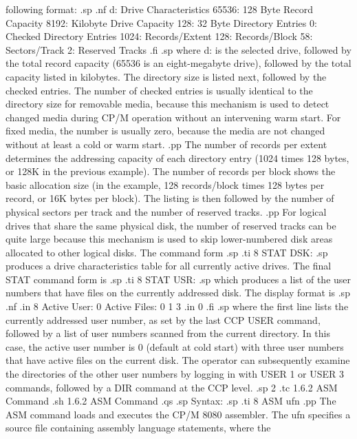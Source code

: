 following format:
.sp
.nf
            d: Drive Characteristics
        65536: 128 Byte Record Capacity
         8192: Kilobyte Drive Capacity
          128: 32 Byte Directory Entries
            0: Checked Directory Entries
         1024: Records/Extent
          128: Records/Block
           58: Sectors/Track
            2: Reserved Tracks
.fi
.sp
where d: is the selected drive, followed by the total record capacity 
(65536 is an eight-megabyte drive), followed by the total capacity listed in 
kilobytes.  The directory size is listed next, followed by the checked 
entries.  The number of checked entries is usually identical to the directory 
size for removable media, because this mechanism is used to detect changed 
media during CP/M operation without an intervening warm start.  For fixed 
media, the number is usually zero, because the media are not changed without 
at least a cold or warm start.  
.pp
The number of records per extent determines 
the addressing capacity of each directory entry (1024 times 128 bytes, or 
128K in the previous example).  The number of records per block shows the 
basic allocation size (in the example, 128 records/block times 128 bytes per 
record, or 16K bytes per block).  The listing is then followed by the number 
of physical sectors per track and the number of reserved tracks.  
.pp
For logical 
drives that share the same physical disk, the number of reserved tracks can 
be quite large because this mechanism is used to skip lower-numbered disk 
areas allocated to other logical disks.  The command form
.sp
.ti 8
STAT DSK:
.sp
produces a drive characteristics table for all currently active drives.  The 
final STAT command form is
.sp
.ti 8
STAT USR:
.sp
which produces a list of the user numbers that have files on the currently 
addressed disk.  The display format is
.sp
.nf
.in 8
Active User:   0
Active Files:  0 1 3
.in 0
.fi
.sp
where the first line lists the currently addressed user number, as set by the 
last CCP USER command, followed by a list of user numbers scanned from the 
current directory. In this case, the active user number is 0 (default at cold 
start) with three user numbers that have active files on the current disk.  
The operator can subsequently examine the directories of the other user 
numbers by logging in with USER 1 or USER 3 commands, followed by a DIR 
command at the CCP level.
.sp 2
.tc         1.6.2  ASM Command
.sh
1.6.2  ASM Command
.qs
.sp
Syntax:
.sp
.ti 8
ASM ufn
.pp
The ASM command loads and executes the CP/M 8080 assembler.  The ufn 
specifies a source file containing assembly language statements, where the 
